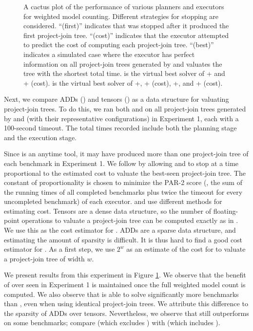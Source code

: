 \begin{figure}[t]
	\centering
	
    \vspace*{-1cm}
	\caption{
	A cactus plot of the performance of various planners and executors for weighted model counting.
    Different strategies for stopping \Lg{} are considered.
    ``(first)'' indicates that \Lg{} was stopped after it produced the first project-join tree.
    ``(cost)'' indicates that the executor attempted to predict the cost of computing each project-join tree.
    ``(best)'' indicates a simulated case where the executor has perfect information on all project-join trees generated by \Lg{} and valuates the tree with the shortest total time.
     is the virtual best solver of \Dmc{}+\Htb{} and \Dmc{}+\Lg{} (cost).
	 is the virtual best solver of \Dmc{}+\Htb{}, \Dmc{}+\Lg{} (cost), \Tensor{}+\Htb{}, and \Tensor{}+\Lg{} (cost).}
	\label{fig:execution}
\end{figure}

Next, we compare ADDs (\Dmc) and tensors (\Tensor) as a data structure for valuating project-join trees.
To do this, we ran both \Dmc{} and \Tensor{} on all project-join trees generated by \Htb{} and \Lg{} (with their representative configurations) in Experiment 1, each with a 100-second timeout.
The total times recorded include both the planning stage and the execution stage.

Since \Lg{} is an anytime tool, it may have produced more than one project-join tree of each benchmark in Experiment 1.
We follow \cite{dudek2019efficient} by allowing \Tensor{} and \Dmc{} to stop \Lg{} at a time proportional to the estimated cost to valuate the best-seen project-join tree.
The constant of proportionality is chosen to minimize the PAR-2 score (\ie, the sum of the running times of all completed benchmarks plus twice the timeout for every uncompleted benchmark) of each executor.
\Tensor{} and \Dmc{} use different methods for estimating cost.
Tensors are a dense data structure, so the number of floating-point operations to valuate a project-join tree can be computed exactly as in \cite{dudek2019efficient}.
We use this as the cost estimator for \Tensor{}.
ADDs are a sparse data structure, and estimating the amount of sparsity is difficult.
It is thus hard to find a good cost estimator for \Dmc{}.
As a first step, we use $2^w$ as an estimate of the cost for \Dmc{} to valuate a project-join tree of width $w$.

We present results from this experiment in Figure \ref{fig:execution}.
We observe that the benefit of \Lg{} over \Htb{} seen in Experiment 1 is maintained once the full weighted model count is computed.
We also observe that \Dmc{} is able to solve significantly more benchmarks than \Tensor{}, even when using identical project-join trees.
We attribute this difference to the sparsity of ADDs over tensors.
Nevertheless, we observe that \Tensor{} still outperforms \Dmc{} on some benchmarks; compare  (which excludes \Tensor{}) with  (which includes \Tensor{}).

